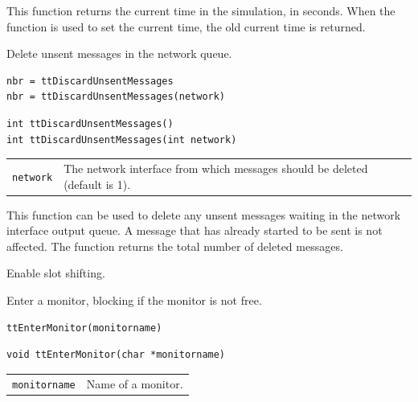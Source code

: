 \documentclass[final,twoside]{rapport}
\begin{document}
\descr This function returns the current time in the simulation, in
seconds. When the function is used to set the current time, the old
current time is returned.



\purpose
Delete unsent messages in the network queue.

\Msyntax
\begin{verbatim}
nbr = ttDiscardUnsentMessages
nbr = ttDiscardUnsentMessages(network)
\end{verbatim}

\Csyntax
\begin{verbatim}
int ttDiscardUnsentMessages()
int ttDiscardUnsentMessages(int network)
\end{verbatim}

\args
\begin{tabularx}{\hsize}{l>{\raggedright\arraybackslash}X}
  {\tt network} & The network interface from which  messages should be
              deleted (default is 1). \\
\end{tabularx}

\descr This function can be used to delete any unsent messages waiting
in the network interface output queue. A message that has already
started to be sent is not affected. The function returns the total
number of deleted messages.



\purpose
Enable slot shifting.



\purpose
Enter a monitor, blocking if the monitor is not free.

\Msyntax
\begin{verbatim}
ttEnterMonitor(monitorname) 
\end{verbatim}

\Csyntax
\begin{verbatim}
void ttEnterMonitor(char *monitorname) 
\end{verbatim}

\args
\begin{tabularx}{\hsize}{l>{\raggedright\arraybackslash}X}
  {\tt monitorname} & Name of a monitor.
\end{tabularx}
\end{document}
